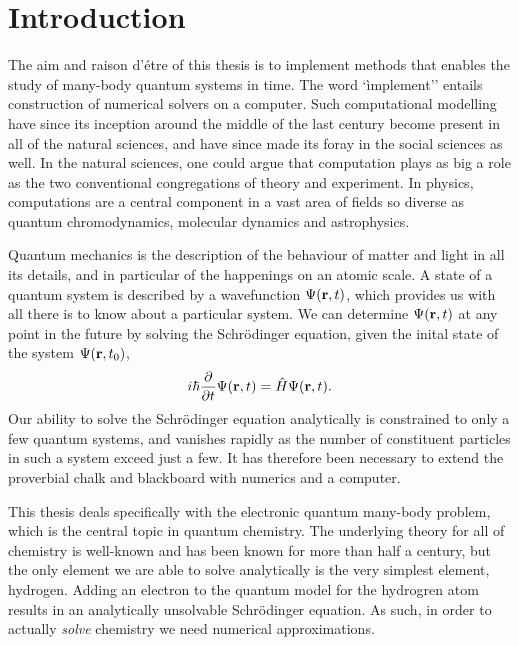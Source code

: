 \chapter{Introduction}

    The aim and raison d'étre of this thesis is to implement methods that enables the 
    study of many-body quantum systems in time. The word `ìmplement'' entails construction 
    of numerical solvers on a computer. Such computational modelling have since its 
    inception around the middle of the last century become present in all of the natural 
    sciences, and have since made its foray in the social sciences as well. In the 
    natural sciences, one could argue that computation plays as big a role as the two 
    conventional congregations of theory and experiment. In physics, computations are 
    a central component in a vast area of fields so diverse as
    quantum chromodynamics\cite{pederiva2018computing,vege2019solving},
    molecular dynamics\cite{stende2017constructing,treider2017speeding} and 
    astrophysics\cite{sand2016massive}.

    Quantum mechanics is the description of the behaviour of matter and light in all 
    its details, and in particular of the happenings on an atomic scale. A state of 
    a quantum system is described by a wavefunction $\Psi(\vb{r}, t)$, which provides 
    us with all there is to know about a particular system. We can determine
    $\Psi(\vb{r}, t)$
    at any point in the future by solving the Schrödinger equation, given the inital 
    state of the system $\Psi(\vb{r}, t_0)$,
    \begin{equation}
        i\hbar \frac{\partial}{\partial t} \Psi(\vb{r}, t) = \hat{H} \Psi(\vb{r}, t).
    \end{equation}
    Our ability to solve the Schrödinger equation analytically is constrained to only 
    a few quantum systems, and vanishes rapidly as the number of constituent particles in 
    such a system exceed just a few. It has therefore been necessary to extend the proverbial
    chalk and 
    blackboard with numerics and a computer.
    
    This thesis deals specifically with the electronic quantum many-body problem, 
    which is the central topic in quantum chemistry. The underlying theory for all of chemistry 
    is well-known and has been known for more than half a century, but the only element 
    we are able to solve analytically is the very simplest element, hydrogen.
    Adding an electron to the quantum model for the hydrogren atom results in an analytically 
    unsolvable Schrödinger equation. As such, in order to actually \emph{solve} chemistry we 
    need numerical approximations.


